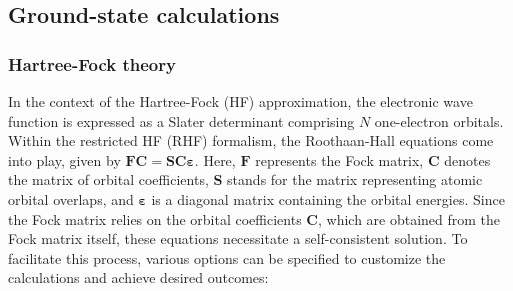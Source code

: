 \documentclass[aip,jcp,reprint,noshowkeys,superscriptaddress]{revtex4-1}
\newcommand{\FkMat}{\bm{F}}
\newcommand{\FMat}{\bm{F}}
\newcommand{\SMat}{\bm{S}}
\newcommand{\CMat}{\bm{C}}
\newcommand{\MOevMat}{\bm{\varepsilon}}
\begin{document}
\subsection{Ground-state calculations}

\subsubsection*{Hartree-Fock theory}
In the context of the Hartree-Fock (HF) approximation, the electronic wave function is expressed as a Slater determinant comprising $N$ one-electron orbitals. \cite{SzaboBook} Within the restricted HF (RHF) formalism, the Roothaan-Hall equations come into play, given by $\FkMat \CMat = \SMat \CMat \MOevMat$. Here, $\FMat$ represents the Fock matrix, $\CMat$ denotes the matrix of orbital coefficients, $\SMat$ stands for the matrix representing atomic orbital overlaps, and $\MOevMat$ is a diagonal matrix containing the orbital energies.
Since the Fock matrix relies on the orbital coefficients $\CMat$, which are obtained from the Fock matrix itself, these equations necessitate a self-consistent solution. To facilitate this process, various options can be specified to customize the calculations and achieve desired outcomes: 
\end{document}
